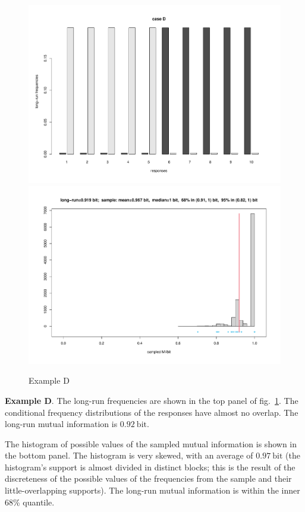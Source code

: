 \documentclass[\ifafour a4paper,12pt,\else a5paper,10pt,\fi%
onecolumn,oneside,article,%
british%
]{memoir}
\theoremstyle{remark}
\theoremstyle{innote}
\renewcommand*{\|}[1][]{\nonscript\,#1\vert\nonscript\;\mathopen{}}
\renewcommand*{\=}{\TextOrMath\texteq\eq}
\newcommand*{\fig}{fig.}%
\newcommand*{\bit}{\mathrm{bit}}
\begin{document}
\clearpage

\begin{figure}[p]%
\centering\includegraphics[width=\linewidth]{scripts/resp_caseD.pdf}\\%
\includegraphics[width=\linewidth]{scripts/histo_caseD.pdf}\\
\caption{Example D}\label{fig:resp_caseD}
\end{figure}%
\textbf{Example D}. The long-run frequencies are shown in the top panel of
\fig~\ref{fig:resp_caseD}. The conditional frequency distributions of the
responses have almost no overlap. The long-run mutual information is
$0.92\:\bit$.

The histogram of possible values of the sampled mutual information is shown
in the bottom panel. The histogram is very skewed, with an average of
$0.97\:\bit$ (the histogram's support is almost divided in distinct blocks;
this is the result of the discreteness of the possible values of the
frequencies from the sample and their little-overlapping supports). The
long-run mutual information is within the inner 68\% quantile.
\end{document}
